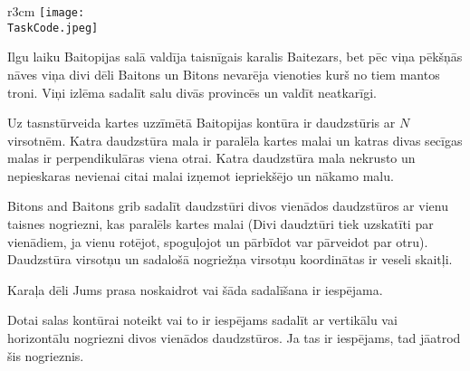 \documentclass{boi2014-lv}
\renewcommand{\TaskCode}{demarcation}
\begin{document}
    \begin{wrapfigure}{r}{3cm}
        \vspace{-24pt}
		\texttt{[image: \\TaskCode.jpeg]}
	\end{wrapfigure}

		Ilgu laiku Baitopijas salā valdīja taisnīgais karalis Baitezars, bet pēc viņa pēkšņās nāves viņa divi dēli Baitons un Bitons nevarēja vienoties kurš no tiem mantos troni. Viņi izlēma sadalīt salu divās provincēs un valdīt neatkarīgi.
 
		Uz tasnstūrveida kartes uzzīmētā Baitopijas kontūra ir daudzstūris ar $N$ virsotnēm. Katra daudzstūra mala ir paralēla kartes malai un katras divas secīgas malas ir perpendikulāras viena otrai. %
Katra daudzstūra mala nekrusto un nepieskaras nevienai citai malai izņemot iepriekšējo un nākamo malu.

Bitons and Baitons grib sadalīt daudzstūri divos vienādos daudzstūros ar vienu taisnes nogriezni, kas paralēls kartes malai (Divi daudztūri tiek uzskatīti par vienādiem, ja vienu rotējot, spoguļojot un pārbīdot var pārveidot par otru). Daudzstūra virsotņu un sadalošā nogriežņa virsotņu koordinātas ir veseli skaitļi. 
 
		Karaļa dēli Jums prasa noskaidrot vai šāda sadalīšana ir iespējama.

    \Task
		
		Dotai salas kontūrai noteikt vai to ir iespējams sadalīt ar vertikālu vai horizontālu nogriezni divos vienādos daudzstūros. Ja tas ir iespējams, tad jāatrod šis nogrieznis.
\end{document}
